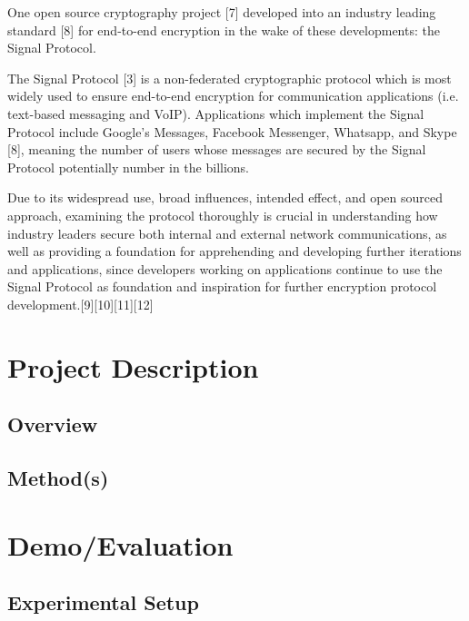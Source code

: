 \documentclass[12pt]{article}
\begin{document}
One open source cryptography project [7] developed into an industry leading standard [8]
 for end-to-end encryption in the wake of these developments: the Signal Protocol.  

The Signal Protocol [3] is a non-federated cryptographic protocol which is most widely used to ensure end-to-end encryption for communication applications (i.e. text-based messaging and VoIP). Applications which implement the Signal Protocol include Google’s Messages, Facebook Messenger, Whatsapp, and Skype [8], meaning the number of users whose messages are secured by the Signal Protocol potentially number in the billions.

Due to its widespread use, broad influences, intended effect, and open sourced approach, examining the protocol thoroughly is crucial in understanding how industry leaders secure both internal and external network communications, as well as providing a foundation for apprehending and developing further iterations and applications, since developers working on applications continue to use the Signal Protocol as foundation and inspiration for further encryption protocol development.[9][10][11][12]


\newpage
\section{Project Description}

\subsection{Overview}
\par  %

\subsection{Method(s)}
\par %

\newpage
\section{Demo/Evaluation}
\subsection{Experimental Setup}
\par %
\end{document}
